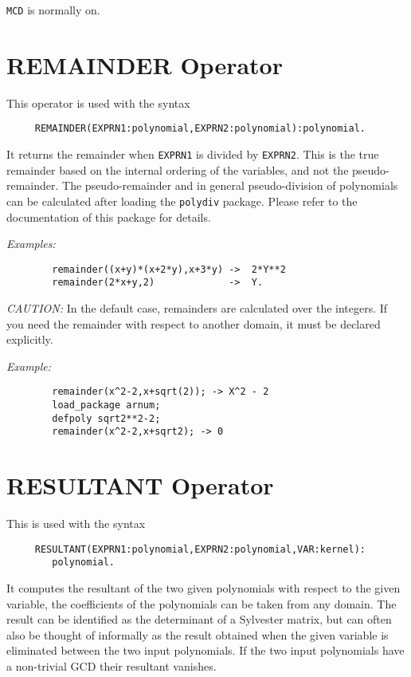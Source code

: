 {\tt MCD} is normally on.

\section{REMAINDER Operator}

This operator is used with the syntax
\begin{verbatim}
     REMAINDER(EXPRN1:polynomial,EXPRN2:polynomial):polynomial.
\end{verbatim}
It returns the remainder when {\tt EXPRN1} is divided by {\tt EXPRN2}.  This
is the true remainder based on the internal ordering of the variables, and
not the pseudo-remainder. The pseudo-remainder 
and in general pseudo-division  of polynomials
can be calculated after loading  the {\tt polydiv} package.
Please refer to the documentation of this package for details.

{\it Examples:}
\begin{verbatim}
        remainder((x+y)*(x+2*y),x+3*y) ->  2*Y**2
        remainder(2*x+y,2)             ->  Y.
\end{verbatim}

{\it CAUTION:} In the default case, remainders are calculated over the
integers.  If you need the remainder with respect to another domain, it
must be declared explicitly.

{\it Example:}
\begin{verbatim}
        remainder(x^2-2,x+sqrt(2)); -> X^2 - 2
        load_package arnum;
        defpoly sqrt2**2-2;
        remainder(x^2-2,x+sqrt2); -> 0
\end{verbatim}

\section{RESULTANT Operator}

This is used with the syntax
\begin{verbatim}
     RESULTANT(EXPRN1:polynomial,EXPRN2:polynomial,VAR:kernel):
        polynomial.
\end{verbatim}
It computes the resultant of the two given polynomials with respect to the
given variable, the coefficients of the polynomials can be taken from any
domain. The result can be identified as the determinant of a
Sylvester matrix, but can often also be thought of informally as the
result obtained when the given variable is eliminated between the two input
polynomials. If the two input polynomials have a non-trivial GCD their
resultant vanishes.

